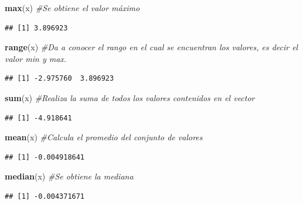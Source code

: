 \documentclass[
]{book}
\newenvironment{Shaded}{\begin{snugshade}}{\end{snugshade}}
\newcommand{\CommentTok}[1]{\textcolor[rgb]{0.56,0.35,0.01}{\textit{#1}}}
\newcommand{\FunctionTok}[1]{\textcolor[rgb]{0.13,0.29,0.53}{\textbf{#1}}}
\newcommand{\NormalTok}[1]{#1}
\begin{document}
\begin{Shaded}
\begin{Highlighting}[]
\FunctionTok{max}\NormalTok{(x) }\CommentTok{\#Se obtiene el valor máximo}
\end{Highlighting}
\end{Shaded}

\begin{verbatim}
## [1] 3.896923
\end{verbatim}

\begin{Shaded}
\begin{Highlighting}[]
\FunctionTok{range}\NormalTok{(x) }\CommentTok{\#Da a conocer el rango en el cual se encuentran los valores, es decir el valor min y max. }
\end{Highlighting}
\end{Shaded}

\begin{verbatim}
## [1] -2.975760  3.896923
\end{verbatim}

\begin{Shaded}
\begin{Highlighting}[]
\FunctionTok{sum}\NormalTok{(x) }\CommentTok{\#Realiza la suma de todos los valores contenidos en el vector }
\end{Highlighting}
\end{Shaded}

\begin{verbatim}
## [1] -4.918641
\end{verbatim}

\begin{Shaded}
\begin{Highlighting}[]
\FunctionTok{mean}\NormalTok{(x) }\CommentTok{\#Calcula el promedio del conjunto de valores }
\end{Highlighting}
\end{Shaded}

\begin{verbatim}
## [1] -0.004918641
\end{verbatim}

\begin{Shaded}
\begin{Highlighting}[]
\FunctionTok{median}\NormalTok{(x) }\CommentTok{\#Se obtiene la mediana }
\end{Highlighting}
\end{Shaded}

\begin{verbatim}
## [1] -0.004371671
\end{verbatim}
\end{document}
